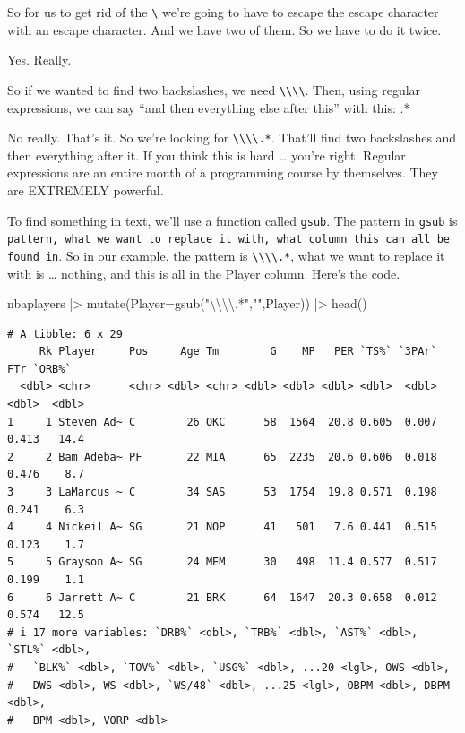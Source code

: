 \documentclass[
  letterpaper,
  DIV=11,
  numbers=noendperiod]{scrreprt}
\newenvironment{Shaded}{\begin{snugshade}}{\end{snugshade}}
\newcommand{\AttributeTok}[1]{\textcolor[rgb]{0.40,0.45,0.13}{#1}}
\newcommand{\FunctionTok}[1]{\textcolor[rgb]{0.28,0.35,0.67}{#1}}
\newcommand{\NormalTok}[1]{\textcolor[rgb]{0.00,0.23,0.31}{#1}}
\newcommand{\SpecialCharTok}[1]{\textcolor[rgb]{0.37,0.37,0.37}{#1}}
\newcommand{\StringTok}[1]{\textcolor[rgb]{0.13,0.47,0.30}{#1}}
\begin{document}
So for us to get rid of the \texttt{\textbackslash{}} we're going to
have to escape the escape character with an escape character. And we
have two of them. So we have to do it twice.

Yes. Really.

So if we wanted to find two backslashes, we need
\texttt{\textbackslash{}\textbackslash{}\textbackslash{}\textbackslash{}}.
Then, using regular expressions, we can say ``and then everything else
after this'' with this: .*

No really. That's it. So we're looking for
\texttt{\textbackslash{}\textbackslash{}\textbackslash{}\textbackslash{}.*}.
That'll find two backslashes and then everything after it. If you think
this is hard \ldots{} you're right. Regular expressions are an entire
month of a programming course by themselves. They are EXTREMELY
powerful.

To find something in text, we'll use a function called \texttt{gsub}.
The pattern in \texttt{gsub} is
\texttt{pattern,\ what\ we\ want\ to\ replace\ it\ with,\ what\ column\ this\ can\ all\ be\ found\ in}.
So in our example, the pattern is
\texttt{\textbackslash{}\textbackslash{}\textbackslash{}\textbackslash{}.*},
what we want to replace it with is \ldots{} nothing, and this is all in
the Player column. Here's the code.

\begin{Shaded}
\begin{Highlighting}[]
\NormalTok{nbaplayers }\SpecialCharTok{|\textgreater{}} \FunctionTok{mutate}\NormalTok{(}\AttributeTok{Player=}\FunctionTok{gsub}\NormalTok{(}\StringTok{"}\SpecialCharTok{\textbackslash{}\textbackslash{}\textbackslash{}\textbackslash{}}\StringTok{.*"}\NormalTok{,}\StringTok{""}\NormalTok{,Player)) }\SpecialCharTok{|\textgreater{}} \FunctionTok{head}\NormalTok{()}
\end{Highlighting}
\end{Shaded}

\begin{verbatim}
# A tibble: 6 x 29
     Rk Player     Pos     Age Tm        G    MP   PER `TS%` `3PAr`   FTr `ORB%`
  <dbl> <chr>      <chr> <dbl> <chr> <dbl> <dbl> <dbl> <dbl>  <dbl> <dbl>  <dbl>
1     1 Steven Ad~ C        26 OKC      58  1564  20.8 0.605  0.007 0.413   14.4
2     2 Bam Adeba~ PF       22 MIA      65  2235  20.6 0.606  0.018 0.476    8.7
3     3 LaMarcus ~ C        34 SAS      53  1754  19.8 0.571  0.198 0.241    6.3
4     4 Nickeil A~ SG       21 NOP      41   501   7.6 0.441  0.515 0.123    1.7
5     5 Grayson A~ SG       24 MEM      30   498  11.4 0.577  0.517 0.199    1.1
6     6 Jarrett A~ C        21 BRK      64  1647  20.3 0.658  0.012 0.574   12.5
# i 17 more variables: `DRB%` <dbl>, `TRB%` <dbl>, `AST%` <dbl>, `STL%` <dbl>,
#   `BLK%` <dbl>, `TOV%` <dbl>, `USG%` <dbl>, ...20 <lgl>, OWS <dbl>,
#   DWS <dbl>, WS <dbl>, `WS/48` <dbl>, ...25 <lgl>, OBPM <dbl>, DBPM <dbl>,
#   BPM <dbl>, VORP <dbl>
\end{verbatim}
\end{document}
